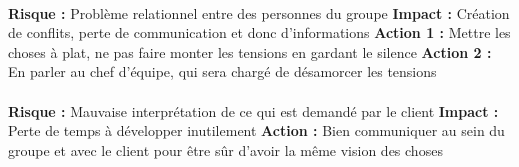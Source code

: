 \paragraph{}

\noindent \textbf{Risque : } Problème relationnel entre des personnes du groupe
\newline
\textbf{Impact : } Création de conflits, perte de communication et donc d’informations
\newline
\textbf{Action 1 : } Mettre les choses à plat, ne pas faire monter les tensions en gardant le silence
\newline
\textbf{Action 2 : } En parler au chef d’équipe, qui sera chargé de désamorcer les tensions

\paragraph{}

\noindent \textbf{Risque : } Mauvaise interprétation de ce qui est demandé par le client
\newline
\textbf{Impact : } Perte de temps à développer inutilement
\newline
\textbf{Action : } Bien communiquer au sein du groupe et avec le client pour être sûr d’avoir la même vision des choses













